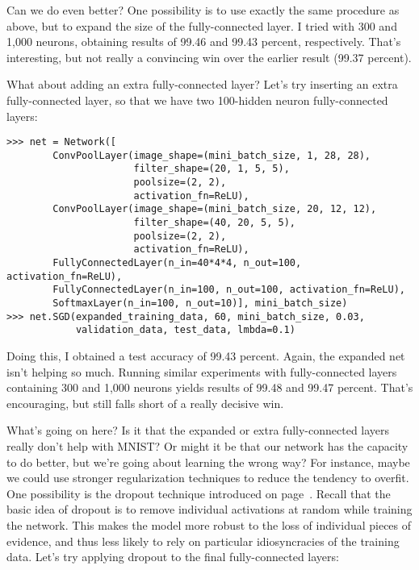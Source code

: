 Can we do even better? One possibility is to use exactly the same procedure as above, but to expand the size of the fully-connected layer. I tried with 300 and 1,000 neurons, obtaining results of 99.46 and 99.43 percent, respectively. That's interesting, but not really a convincing win over the earlier result (99.37 percent).

What about adding an extra fully-connected layer? Let's try inserting an extra fully-connected layer, so that we have two 100-hidden neuron fully-connected layers: 

\begin{lstlisting}
>>> net = Network([
        ConvPoolLayer(image_shape=(mini_batch_size, 1, 28, 28), 
                      filter_shape=(20, 1, 5, 5), 
                      poolsize=(2, 2), 
                      activation_fn=ReLU),
        ConvPoolLayer(image_shape=(mini_batch_size, 20, 12, 12), 
                      filter_shape=(40, 20, 5, 5), 
                      poolsize=(2, 2), 
                      activation_fn=ReLU),
        FullyConnectedLayer(n_in=40*4*4, n_out=100, activation_fn=ReLU),
        FullyConnectedLayer(n_in=100, n_out=100, activation_fn=ReLU),
        SoftmaxLayer(n_in=100, n_out=10)], mini_batch_size)
>>> net.SGD(expanded_training_data, 60, mini_batch_size, 0.03, 
            validation_data, test_data, lmbda=0.1)
\end{lstlisting}

Doing this, I obtained a test accuracy of 99.43 percent. Again, the expanded net isn't helping so much. Running similar experiments with fully-connected layers containing 300 and 1,000 neurons yields results of 99.48 and 99.47 percent. That's encouraging, but still falls short of a really decisive win.

What's going on here? \label{page:Whatsgoingonhere} Is it that the expanded or extra fully-connected layers really don't help with MNIST? Or might it be that our network has the capacity to do better, but we're going about learning the wrong way? For instance, maybe we could use stronger regularization techniques to reduce the tendency to overfit. One possibility is the dropout technique introduced on page~\pageref{page:dropout}. Recall that the basic idea of dropout is to remove individual activations at random while training the network. This makes the model more robust to the loss of individual pieces of evidence, and thus less likely to rely on particular idiosyncracies of the training data. Let's try applying dropout to the final fully-connected layers:

